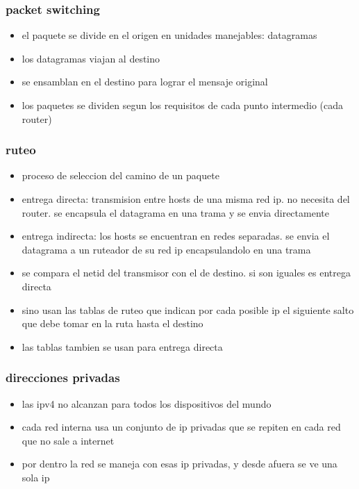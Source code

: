\documentclass[11pt]{article}
\begin{document}
\subsubsection{packet switching}
\label{sec:org98326d3}
\begin{itemize}
\item el paquete se divide en el origen en unidades manejables: datagramas
\item los datagramas viajan al destino
\item se ensamblan en el destino para lograr el mensaje original
\item los paquetes se dividen segun los requisitos de cada punto intermedio (cada router)
\end{itemize}
\subsubsection{ruteo}
\label{sec:org9a1677c}
\begin{itemize}
\item proceso de seleccion del camino de un paquete
\item entrega directa: transmision entre hosts de una misma red ip. no necesita del router. se encapsula el datagrama en una trama y se envia directamente
\item entrega indirecta: los hosts se encuentran en redes separadas. se envia el datagrama a un ruteador de su red ip encapsulandolo en una trama
\item se compara el netid del transmisor con el de destino. si son iguales es entrega directa
\item sino usan las tablas de ruteo que indican por cada posible ip el siguiente salto que debe tomar en la ruta hasta el destino
\item las tablas tambien se usan para entrega directa
\end{itemize}
\subsubsection{direcciones privadas}
\label{sec:org324b07f}
\begin{itemize}
\item las ipv4 no alcanzan para todos los dispositivos del mundo
\item cada red interna usa un conjunto de ip privadas que se repiten en cada red que no sale a internet
\item por dentro la red se maneja con esas ip privadas, y desde afuera se ve una sola ip
\end{itemize}
\end{document}
